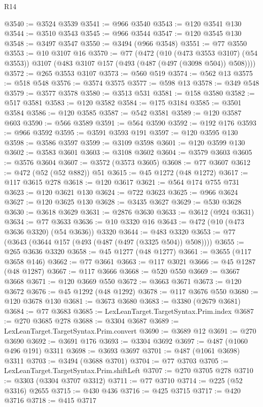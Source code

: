 \begin{lexlean}{R14}
\begin{coremodule}
@3540 := @3524 @3539
@3541 := @966 @3540
@3543 := @120 @3541 @130
@3544 := @3510 @3543
@3545 := @966 @3544
@3547 := @120 @3545 @130
@3548 := @3497 @3547
@3550 := @3494 (@966 @3548)
@3551 := @77 @3550
@3553 := @10 @3107 @16
@3570 := @77
    (@472
      (@10 (@473 @3553 @3107) (@54 @3553))
      @3107
      (@483 @3107 @157 (@493 (@487 (@497 (@3098 @504)) @508))))
@3572 := @265 @3553 @3107
@3573 := @560 @519
@3574 := @562 @13
@3575 := @518 @548
@3576 := @3574 @3575
@3577 := @598 @13
@3578 := @349 @548
@3579 := @3577 @3578
@3580 := @3513 @531
@3581 := @158 @3580
@3582 := @517 @3581
@3583 := @120 @3582
@3584 := @175 @3184
@3585 := @3501 @3584
@3586 := @120 @3585
@3587 := @542 @3581
@3589 := @120 @3587 @603
@3590 := @566 @3589
@3591 := @564 @3590
@3592 := @192 @176
@3593 := @966 @3592
@3595 := @3591 @3593 @191
@3597 := @120 @3595 @130
@3598 := @3586 @3597
@3599 := @3109 @3598
@3601 := @120 @3599 @130
@3602 := @3583 @3601
@3603 := @3108 @3602
@3604 := @3579 @3603
@3605 := @3576 @3604
@3607 := @3572 (@3573 @3605)
@3608 := @77 @3607
@3612 := @472 (@52 (@52 @882)) @51
@3615 := @45 @1272 (@48 @1272)
@3617 := @117 @3615 @278
@3618 := @120 @3617
@3621 := @564 @174 @755 @731
@3623 := @120 @3621 @130
@3624 := @722 @3623
@3625 := @966 @3624
@3627 := @120 @3625 @130
@3628 := @3435 @3627
@3629 := @530 @3628
@3630 := @3618 @3629
@3631 := @2876 @3630
@3633 := @3612 (@924 @3631)
@3634 := @77 @3633
@3636 := @10 @3320 @16
@3643 := @472 (@10 (@473 @3636 @3320) (@54 @3636)) @3320
@3644 := @483 @3320
@3653 := @77 (@3643 (@3644 @157 (@493 (@487 (@497 (@3325 @504)) @508))))
@3655 := @265 @3636 @3320
@3658 := @45 @1277 (@48 @1277)
@3661 := @3655 (@117 @3658 @146)
@3662 := @77 @3661
@3663 := @117 @3021
@3666 := @45 @1287 (@48 @1287)
@3667 := @117 @3666
@3668 := @520 @550
@3669 := @3667 @3668
@3671 := @120 @3669 @550
@3672 := @3663 @3671
@3673 := @120 @3672
@3676 := @45 @1292 (@48 @1292)
@3678 := @117 @3676 @550
@3680 := @120 @3678 @130
@3681 := @3673 @3680
@3683 := @3380 (@2679 @3681)
@3684 := @77 @3683
@3685 := LexLeanTarget.TargetSyntax.Prim.index
@3687 := @270 @3685 @278
@3688 := @3304 @3687
@3689 := LexLeanTarget.TargetSyntax.Prim.convert
@3690 := @3689 @12
@3691 := @270 @3690
@3692 := @3691 @176
@3693 := @3304 @3692
@3697 := @487 (@1060 @496 @191) @3311
@3698 := @3693 @3697
@3701 := @487 (@1061 @3698) @3311
@3703 := @3494 (@3688 @3701)
@3704 := @77 @3703
@3705 := LexLeanTarget.TargetSyntax.Prim.shiftLeft
@3707 := @270 @3705 @278
@3710 := @3303 (@3304 @3707 @3312)
@3711 := @77 @3710
@3714 := @225 (@52 @3316) @2655
@3715 := @430 @436
@3716 := @425 @3715
@3717 := @420 @3716
@3718 := @415 @3717

\end{coremodule}
\end{lexlean}
